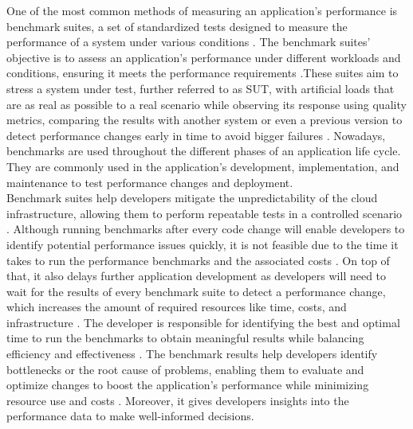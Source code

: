 One of the most common methods of measuring an application’s performance is benchmark suites, a set of standardized tests designed to measure the performance of a system under various conditions \cite{alghamdi2023towards}. The benchmark suites’ objective is to assess an application’s performance under different workloads and conditions, ensuring it meets the performance requirements \cite{alghamdi2023towards, japke2023earlymicrobenchmarkcatches}.These suites aim to stress a system under test, further referred to as \ac{SUT}, with artificial loads that are as real as possible to a real scenario while observing its response using quality metrics, comparing the results with another system or even a previous version to detect performance changes early in time to avoid bigger failures \cite{alghamdi2023towards, japke2023earlymicrobenchmarkcatches, grambow, grambow2021usingApplication, varghese2021survey, folkerts2012benchmarking}. Nowadays, benchmarks are used throughout the different phases of an application life cycle. They are commonly used in the application’s development, implementation, and maintenance to test performance changes \cite{tsuji2017performanceprojection} and deployment. \\
Benchmark suites help developers mitigate the unpredictability of the cloud infrastructure, allowing them to perform repeatable tests in a controlled scenario \cite{japke2023earlymicrobenchmarkcatches}. Although running benchmarks after every code change will enable developers to identify potential performance issues quickly, it is not feasible due to the time it takes to run the performance benchmarks and the associated costs \cite{grambow, alshoaibi2019DetectionofPerformance, he2019statistics}. On top of that, it also delays further application development as developers will need to wait for the results of every benchmark suite to detect a performance change, which increases the amount of required resources like time, costs, and infrastructure \cite{alshoaibi2019DetectionofPerformance, grambow, grambow2021usingApplication, he2019statistics}. The developer is responsible for identifying the best and optimal time to run the benchmarks to obtain meaningful results while balancing efficiency and effectiveness \cite{de2017perphecyperformance}. The benchmark results help developers identify bottlenecks or the root cause of problems, enabling them to evaluate and optimize changes to boost the application’s performance while minimizing resource use and costs \cite{alshoaibi2019DetectionofPerformance, he2019statistics}. Moreover, it gives developers insights into the performance data to make well-informed decisions. \\
